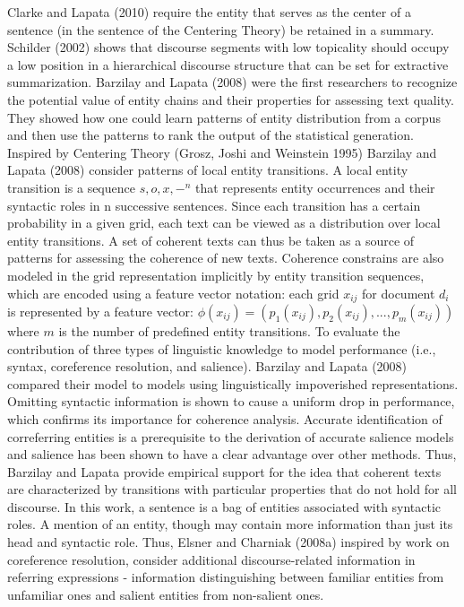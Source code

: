 Clarke and Lapata (2010) require the entity that serves as the center of a sentence (in the sentence of the Centering Theory) be retained in a summary. 
Schilder (2002) shows that discourse segments with low topicality should occupy a low position in a hierarchical discourse structure that can be set for extractive summarization. 
Barzilay and Lapata (2008) were the first researchers to recognize the potential value of entity chains and their properties for assessing text quality. 
They showed how one could learn patterns of entity distribution from a corpus and then use the patterns to rank the output of the statistical generation. 
Inspired by Centering Theory  (Grosz, Joshi and Weinstein 1995) Barzilay and Lapata (2008) consider patterns of local entity transitions. 
A local entity transition is a sequence ${s,o,x,-}^n$ that represents entity occurrences and their syntactic roles in n successive sentences. 
Since each transition has a certain probability in a given grid, each text can be viewed as a distribution over local entity transitions. 
A set of coherent texts can thus be taken as a source of patterns for assessing the coherence of new texts. 
Coherence constrains are also modeled in the grid representation implicitly by entity transition sequences, which are encoded using a feature vector notation: each grid $x_{ij}$ for document $d_i$ is represented by a feature vector:
$ \phi(x_{ij}) = (p_1(x_{ij}),p_2(x_{ij}),...,p_m(x_{ij}))$
where $m$ is the number of predefined entity transitions. 
To evaluate the contribution of three types of linguistic knowledge to model performance (i.e., syntax, coreference resolution, and salience). Barzilay and Lapata (2008) compared their model to models using linguistically impoverished representations. 
Omitting syntactic information is shown to cause a uniform drop in performance, which confirms its importance for coherence analysis. 
Accurate identification of correferring entities is a prerequisite to the derivation of accurate salience models and salience has been shown to have a clear advantage over other methods. 
Thus, Barzilay and Lapata provide empirical support for the idea that coherent texts are characterized by transitions with particular properties that do not hold for all discourse. 
In this work, a sentence is a bag of entities associated with syntactic roles. 
A mention of an entity, though may contain more information than just its head and syntactic role. 
Thus, Elsner and Charniak (2008a) inspired by work on coreference resolution, consider additional discourse-related information in referring expressions - information distinguishing between familiar entities from unfamiliar ones and salient entities from non-salient ones.   

